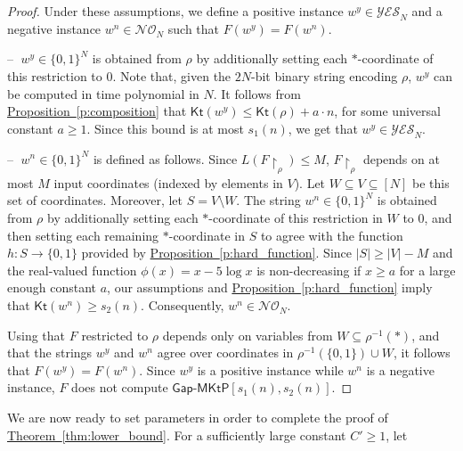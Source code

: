 \documentclass[11pt]{article}
\numberwithin{equation}{section}
\theoremstyle{definition}
\theoremstyle{plain}
\newcommand{\expref}[2]{\hyperref[#2]{#1~\ref{#2}}}
\newcommand{\gapmktp}{\mathsf{Gap}$-$\mathsf{MKtP}}
\newcommand{\Kt}{\mathsf{Kt}}
\begin{document}
\begin{proof}
Under these assumptions, we define a positive instance $w^y \in \mathcal{YES}_N$ and a negative instance $w^n \in \mathcal{NO}_N$ such that $F(w^y) = F(w^n)$.\\

\vspace{-0.3cm}

\noindent -- $\;w^y \in \{0,1\}^N$ is obtained from $\rho$ by additionally setting each $*$-coordinate of this restriction to $0$. Note that, given the $2N$-bit binary string encoding $\rho$, $w^y$ can be computed in time polynomial in $N$. It follows from \expref{Proposition}{p:composition} that $\Kt(w^y) \leq \Kt(\rho) + a \cdot n$, for some universal constant $a \geq 1$. Since this bound is at most $s_1(n)$, we get that $w^y \in \mathcal{YES}_N$.\\

\vspace{-0.3cm}

\noindent -- $\;w^n \in \{0,1\}^N$ is defined as follows. Since $L(F\!\upharpoonright_\rho) \leq M$,  $F\!\upharpoonright_\rho$ depends on at most $M$ input coordinates (indexed by elements in  $V$). Let $W \subseteq V \subseteq [N]$ be this set of coordinates. Moreover, let $S = V \setminus W$. The string $w^n \in \{0,1\}^N$ is obtained from $\rho$ by additionally setting each $*$-coordinate of this restriction in $W$ to $0$, and then setting each remaining $*$-coordinate in $S$ to agree with the function $h \colon S \to \{0,1\}$ provided by \expref{Proposition}{p:hard_function}. Since $|S| \geq |V| - M$ and the real-valued function $\phi(x) = x - 5\log x$ is non-decreasing if $x \geq a$ for a large enough constant $a$, our assumptions and \expref{Proposition}{p:hard_function} imply that $\Kt(w^n) \geq s_2(n)$. Consequently, $w^n \in \mathcal{NO}_N$.\\

\vspace{-0.3cm}

Using that $F$ restricted to $\rho$ depends only on variables from $W \subseteq \rho^{-1}(*)$, and that the strings $w^y$ and $w^n$ agree over coordinates in $\rho^{-1}(\{0,1\}) \cup W$, it follows that $F(w^y) = F(w^n)$. Since $w^y$ is a positive instance while $w^n$ is a negative instance, $F$ does not compute $\gapmktp[s_1(n), s_2(n)]$.
\end{proof}

We are now ready to set parameters in order to complete the proof of \expref{Theorem}{thm:lower_bound}. For a sufficiently large constant $C' \geq 1$, let
\end{document}
